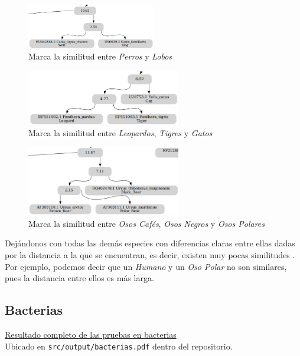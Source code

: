 \documentclass[12pt]{article}
\begin{document}
\begin{figure}[h!]
  \centering
  \includegraphics[width=0.5\textwidth]{images/Diferencia2.png}
  \caption{Marca la similitud entre \textit{Perros} y \textit{Lobos}}
\end{figure}

\begin{figure}[h!]
  \centering
  \includegraphics[width=0.6\textwidth]{images/Diferencia3.png}
  \caption{Marca la similitud entre \textit{Leopardos}, \textit{Tigres} y \textit{Gatos}}
\end{figure}

\begin{figure}[h!]
  \centering
  \includegraphics[width=0.6\textwidth]{images/Diferencia4.png}
  \caption{Marca la similitud entre \textit{Osos Cafés}, \textit{Osos Negros} y \textit{Osos Polares}}
\end{figure}

\newpage
Dejándonos con todas las demás especies con diferencias claras entre ellas dadas por la distancia a la que se encuentran, es decir, existen muy pocas similitudes . Por ejemplo, podemos decir que un \textit{Humano} y un \textit{Oso Polar} no son similares, pues la distancia entre ellos es más larga.
\newpage

\subsection{Bacterias}

\begin{center}
  \href{https://gitlab.com/pppkizbroutle/proyecto-genomica/-/raw/master/src/output/bacteria.pdf?inline=false}{Resultado completo de las pruebas en bacterias}\\
  Ubicado en \texttt{src/output/bacterias.pdf} dentro del repositorio.
\end{center}
\end{document}
